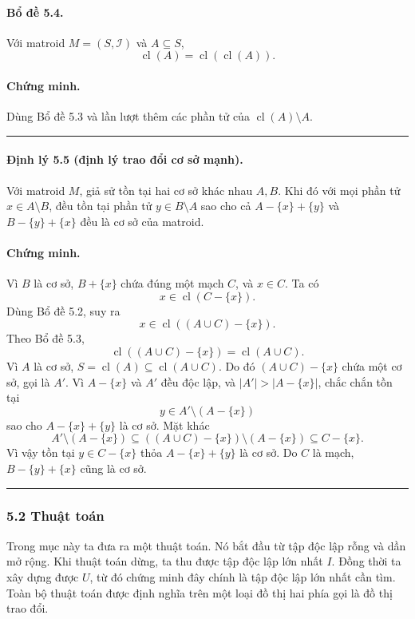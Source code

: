 \documentclass[11pt]{article}
\newcommand{\qedmark}{\hfill\rule{0.7ex}{0.7ex}}
\begin{document}
\paragraph{Bổ đề 5.4.}
Với matroid \(M=(S,\mathcal I)\) và \(A\subseteq S\),
\[
  \operatorname{cl}(A)=\operatorname{cl}(\operatorname{cl}(A)).
\]

\paragraph{Chứng minh.}
Dùng Bổ đề 5.3 và lần lượt thêm các phần tử của \(\operatorname{cl}(A)\setminus
A\). \qedmark

\paragraph{Định lý 5.5 (định lý trao đổi cơ sở mạnh).}
Với matroid \(M\), giả sử tồn tại hai cơ sở khác nhau \(A,B\). Khi đó với mọi
phần tử \(x\in A\setminus B\), đều tồn tại phần tử \(y\in B\setminus A\) sao cho
cả \(A-\{x\}+\{y\}\) và \(B-\{y\}+\{x\}\) đều là cơ sở của matroid.

\paragraph{Chứng minh.}
Vì \(B\) là cơ sở, \(B+\{x\}\) chứa đúng một mạch \(C\), và \(x\in C\). Ta có
\[
  x\in\operatorname{cl}(C-\{x\}).
\]
Dùng Bổ đề 5.2, suy ra
\[
  x\in\operatorname{cl}((A\cup C)-\{x\}).
\]
Theo Bổ đề 5.3,
\[
  \operatorname{cl}((A\cup C)-\{x\})=\operatorname{cl}(A\cup C).
\]
Vì \(A\) là cơ sở, \(S=\operatorname{cl}(A)\subseteq\operatorname{cl}(A\cup C)\).
Do đó \((A\cup C)-\{x\}\) chứa một cơ sở, gọi là \(A'\). Vì \(A-\{x\}\) và
\(A'\) đều độc lập, và \(|A'|>|A-\{x\}|\), chắc chắn tồn tại
\[
  y\in A'\setminus(A-\{x\})
\]
sao cho \(A-\{x\}+\{y\}\) là cơ sở. Mặt khác
\[
  A'\setminus(A-\{x\})\subseteq ((A\cup C)-\{x\})\setminus(A-\{x\})
  \subseteq C-\{x\}.
\]
Vì vậy tồn tại \(y\in C-\{x\}\) thỏa \(A-\{x\}+\{y\}\) là cơ sở. Do \(C\) là
mạch, \(B-\{y\}+\{x\}\) cũng là cơ sở. \qedmark

\subsubsection*{5.2 Thuật toán}

Trong mục này ta đưa ra một thuật toán. Nó bắt đầu từ tập độc lập rỗng và dần
mở rộng. Khi thuật toán dừng, ta thu được tập độc lập lớn nhất \(I\). Đồng thời
ta xây dựng được \(U\), từ đó chứng minh đây chính là tập độc lập lớn nhất cần
tìm. Toàn bộ thuật toán được định nghĩa trên một loại đồ thị hai phía gọi là đồ
thị trao đổi.
\end{document}
